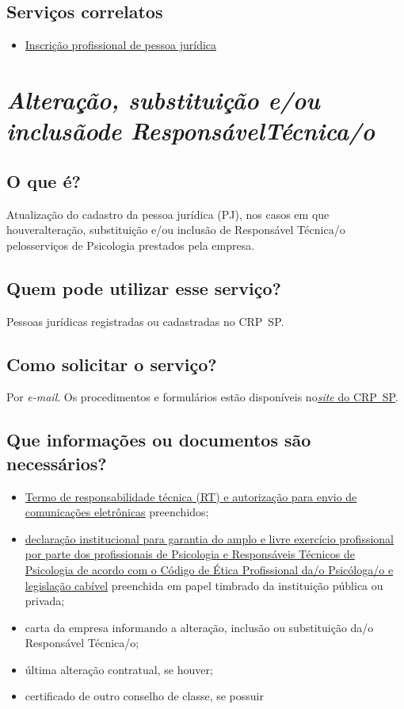 \section{Serviços correlatos}

\begin{itemize}
  \item  \hyperref[]{Inscrição  profissional de pessoa jurídica}
\end{itemize}

\chapter{\texorpdfstring{\emph{Alteração, substituição e/ou inclusãode ResponsávelTécnica/o}}{Alteração, substituição e/ou inclusão de Responsável Técnica/o}}


\section{O que é?}

Atualização do cadastro da pessoa jurídica (PJ), nos casos em que houveralteração, substituição e/ou inclusão de Responsável Técnica/o pelosserviços de Psicologia prestados pela empresa.

\section{Quem pode utilizar esse serviço?}

Pessoas jurídicas registradas ou cadastradas no CRP~SP.

\section{Como solicitar o serviço?}

Por \emph{e-mail}. Os procedimentos e formulários estão disponíveis no\href{https://www.crpsp.org/pagina/view/322}{\emph{site} do CRP~SP}.

\section{Que informações ou documentos são necessários?}

\begin{itemize}
  \item  \hyperref[]{Termo  de responsabilidade técnica (RT) e autorização para envio de  comunicações eletrônicas} preenchidos;
  \item  \hyperref[]{declaração  institucional para garantia do amplo e livre exercício profissional  por parte dos profissionais de Psicologia e Responsáveis Técnicos de  Psicologia de acordo com o Código de Ética Profissional da/o  Psicóloga/o e legislação cabível} preenchida em papel timbrado da  instituição pública ou privada;
  \item  carta da empresa informando a alteração, inclusão ou substituição da/o  Responsável Técnica/o;
  \item  última alteração contratual, se houver;
  \item  certificado de outro conselho de classe, se possuir
\end{itemize}

